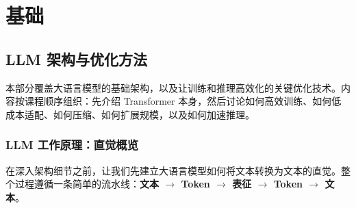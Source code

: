 \part{基础}

\chapter{LLM 架构与优化方法}
\label{llm-architecture-and-optimization-methods}

本部分覆盖大语言模型的基础架构，以及让训练和推理高效化的关键优化技术。内容按课程顺序组织：先介绍 Transformer 本身，然后讨论如何高效训练、如何低成本适配、如何压缩、如何扩展规模，以及如何加速推理。

\section{LLM 工作原理：直觉概览}
\label{how-llms-work-an-intuitive-overview}

在深入架构细节之前，让我们先建立大语言模型如何将文本转换为文本的直觉。整个过程遵循一条简单的流水线：\textbf{文本 $\to$ Token $\to$ 表征 $\to$ Token $\to$ 文本}。

